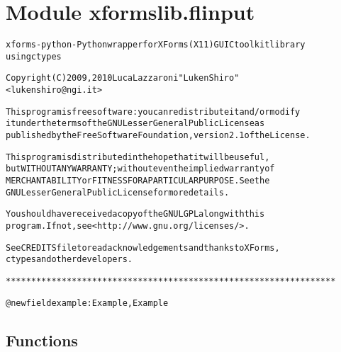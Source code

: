 %
%
%


\section{Module xformslib.flinput}

    \label{xformslib:flinput}
\begin{alltt}

xforms-python - Python wrapper for XForms (X11) GUI C toolkit library
using ctypes

Copyright (C) 2009, 2010  Luca Lazzaroni "LukenShiro"
    {\textless}lukenshiro@ngi.it{\textgreater}

This program is free software: you can redistribute it and/or modify
it under the terms of the GNU Lesser General Public License as
published by the Free Software Foundation, version 2.1 of the License.

This program is distributed in the hope that it will be useful,
but WITHOUT ANY WARRANTY; without even the implied warranty of
MERCHANTABILITY or FITNESS FOR A PARTICULAR PURPOSE. See the
GNU Lesser General Public License for more details.

You should have received a copy of the GNU LGPL along with this
program. If not, see {\textless}http://www.gnu.org/licenses/{\textgreater}.

See CREDITS file to read acknowledgements and thanks to XForms,
ctypes and other developers.

*****************************************************************


@newfield example: Example, Example
\end{alltt}



  \subsection{Functions}

